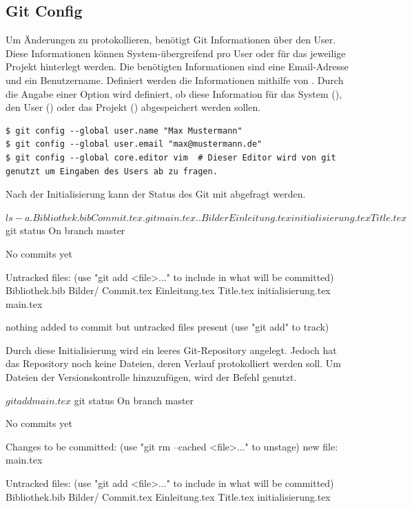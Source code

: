 \subsection{Git Config}
Um Änderungen zu protokollieren, benötigt Git Informationen über den User. Diese Informationen können System-übergreifend pro User oder für das jeweilige Projekt hinterlegt werden. Die benötigten Informationen sind eine Email-Adresse und ein Benutzername. Definiert werden die Informationen mithilfe von . Durch die Angabe einer Option wird definiert, ob diese Information für das System (), den User () oder das Projekt () abgespeichert werden sollen.
\begin{lstlisting}[breaklines=true]
$ git config --global user.name "Max Mustermann"
$ git config --global user.email "max@mustermann.de"
$ git config --global core.editor vim  # Dieser Editor wird von git genutzt um Eingaben des Users ab zu fragen.
\end{lstlisting}
Nach der Initialisierung kann der Status des Git mit  abgefragt werden.
\begin{mplisting}
$ ls -a
.   Bibliothek.bib  Commit.tex      .git                 main.tex
..  Bilder          Einleitung.tex  initialisierung.tex  Title.tex
$ git status
On branch master

No commits yet

Untracked files:
  (use "git add <file>..." to include in what will be committed)
	Bibliothek.bib
	Bilder/
	Commit.tex
	Einleitung.tex
	Title.tex
	initialisierung.tex
	main.tex

nothing added to commit but untracked files present (use "git add" to track)

\end{mplisting}
Durch diese Initialisierung wird ein leeres Git-Repository angelegt. Jedoch hat das Repository noch keine Dateien, deren Verlauf protokolliert werden soll. Um Dateien der Versionskontrolle hinzuzufügen, wird der   Befehl genutzt.
\begin{mplisting}
$ git add main.tex
$ git status
On branch master

No commits yet

Changes to be committed:
  (use "git rm --cached <file>..." to unstage)
	new file:   main.tex

Untracked files:
  (use "git add <file>..." to include in what will be committed)
	Bibliothek.bib
	Bilder/
	Commit.tex
	Einleitung.tex
	Title.tex
	initialisierung.tex
\end{mplisting}
